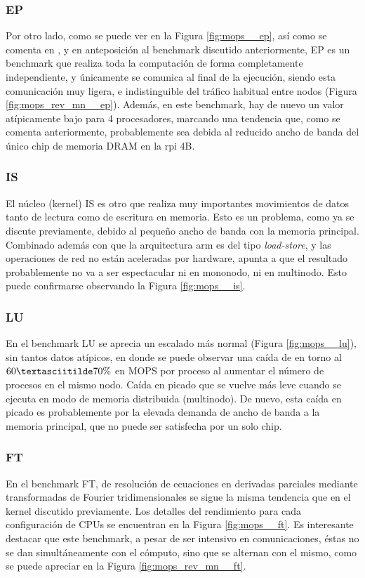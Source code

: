 \subsubsection{EP}
\label{sssec:resultados__ep}
Por otro lado, como se puede ver en la Figura \ref{fig:mops__ep}, así como se comenta en , y en anteposición al benchmark discutido anteriormente, EP es un benchmark que realiza toda la computación de forma completamente independiente, y únicamente se comunica al final de la ejecución, siendo esta comunicación muy ligera, e indistinguible del tráfico habitual entre nodos (Figura \ref{fig:mops_rev_mn__ep}). Además, en este benchmark, hay de nuevo un valor atípicamente bajo para 4 procesadores, marcando una tendencia que, como se comenta anteriormente, probablemente sea debida al reducido ancho de banda del único chip de memoria DRAM en la \acrlong{rpi} 4B.

\subsubsection{IS}
\label{sssec:resultados__is}
El núcleo (kernel) IS es otro que realiza muy importantes movimientos de datos tanto de lectura como de escritura en memoria. Esto es un problema, como ya se discute previamente, debido al pequeño ancho de banda con la memoria principal. Combinado además con que la arquitectura \acrshort{arm} es del tipo \textit{load-store}, y las operaciones de red no están aceleradas por hardware, apunta a que el resultado probablemente no va a ser espectacular ni en mononodo, ni en multinodo. Esto puede confirmarse observando la Figura \ref{fig:mops__is}.

\subsubsection{LU}
\label{sssec:resultados__lu}
En el benchmark LU se aprecia un escalado más normal (Figura \ref{fig:mops__lu}), sin tantos datos atípicos, en donde se puede observar una caída de en torno al $60\textasciitilde70\%$ en MOPS por proceso al aumentar el número de procesos en el mismo nodo. Caída en picado que se vuelve más leve cuando se ejecuta en modo de memoria distribuida (multinodo). De nuevo, esta caída en picado es probablemente por la elevada demanda de ancho de banda a la memoria principal, que no puede ser satisfecha por un solo chip.

\subsubsection{FT}
\label{sssec:resultados__ft}
En el benchmark FT, de resolución de ecuaciones en derivadas parciales mediante transformadas de Fourier tridimensionales se sigue la misma tendencia que en el kernel discutido previamente. Los detalles del rendimiento para cada configuración de CPUs se encuentran en la Figura \ref{fig:mops__ft}. Es interesante destacar que este benchmark, a pesar de ser intensivo en comunicaciones, éstas no se dan simultáneamente con el cómputo, sino que se alternan con el mismo, como se puede apreciar en la Figura \ref{fig:mops_rev_mn__ft}.

